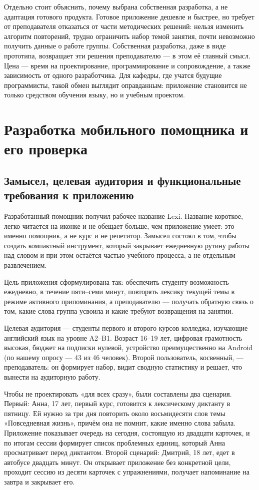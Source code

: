 \documentclass[11pt,a4paper,openany]{report}
\begin{document}
Отдельно стоит объяснить, почему выбрана собственная разработка, а не адаптация готового продукта. Готовое приложение дешевле и быстрее, но требует от преподавателя отказаться от части методических решений: нельзя изменить алгоритм повторений, трудно ограничить набор темой занятия, почти невозможно получить данные о работе группы. Собственная разработка, даже в виде прототипа, возвращает эти решения преподавателю — в этом её главный смысл. Цена — время на проектирование, программирование и сопровождение, а также зависимость от одного разработчика. Для кафедры, где учатся будущие программисты, такой обмен выглядит оправданным: приложение становится не только средством обучения языку, но и учебным проектом.

\chapter{Разработка мобильного помощника и его проверка}

\section{Замысел, целевая аудитория и функциональные требования к приложению}

Разработанный помощник получил рабочее название Lexi. Название короткое, легко читается на иконке и не обещает больше, чем приложение умеет: это именно помощник, а не курс и не репетитор. Замысел состоял в том, чтобы создать компактный инструмент, который закрывает ежедневную рутину работы над словом и при этом остаётся частью учебного процесса, а не отдельным развлечением.

Цель приложения сформулирована так: обеспечить студенту возможность ежедневно, в течение пяти–семи минут, повторять лексику текущей темы в режиме активного припоминания, а преподавателю — получать обратную связь о том, какие слова группа усвоила и какие требуют возвращения на занятии.

Целевая аудитория — студенты первого и второго курсов колледжа, изучающие английский язык на уровне A2–B1. Возраст 16–19 лет, цифровая грамотность высокая, бюджет на подписки нулевой, устройство преимущественно на Android (по нашему опросу — 43 из 46 человек). Второй пользователь, косвенный, — преподаватель: он формирует набор, видит сводную статистику и решает, что вынести на аудиторную работу.

Чтобы не проектировать «для всех сразу», были составлены два сценария. Первый: Анна, 17 лет, первый курс, готовится к лексическому диктанту в пятницу. Ей нужно за три дня повторить около восьмидесяти слов темы «Повседневная жизнь», причём она не помнит, какие именно слова забыла. Приложение показывает очередь на сегодня, состоящую из двадцати карточек, и по итогам сессии формирует список проблемных единиц, который Анна просматривает перед диктантом. Второй сценарий: Дмитрий, 18 лет, едет в автобусе двадцать минут. Он открывает приложение без конкретной цели, проходит сессию из десяти карточек с упражнениями, получает напоминание на завтра и закрывает его.
\end{document}
